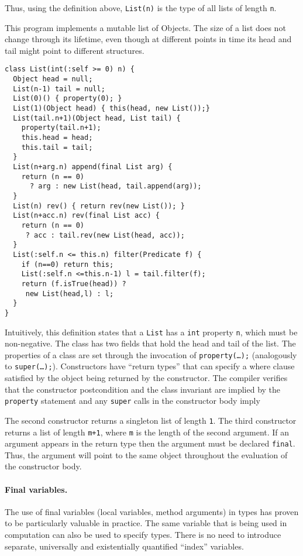 Thus, using the definition above, {\tt List(n)} is the type of
all lists of length {\tt n}.

\begin{example}[List]
This program implements a mutable list of Objects. The size of a list
does not change through its lifetime, even though at different points
in time its head and tail might point to different structures.
{\footnotesize
\begin{verbatim}
class List(int(:self >= 0) n) {
  Object head = null;
  List(n-1) tail = null;
  List(0)() { property(0); }
  List(1)(Object head) { this(head, new List());}
  List(tail.n+1)(Object head, List tail) {
    property(tail.n+1);
    this.head = head;
    this.tail = tail;
  }
  List(n+arg.n) append(final List arg) {
    return (n == 0) 
      ? arg : new List(head, tail.append(arg));
  }
  List(n) rev() { return rev(new List()); }
  List(n+acc.n) rev(final List acc) {
    return (n == 0) 
     ? acc : tail.rev(new List(head, acc));
  }
  List(:self.n <= this.n) filter(Predicate f) {
    if (n==0) return this;
    List(:self.n <=this.n-1) l = tail.filter(f);
    return (f.isTrue(head)) ?
     new List(head,l) : l;
  }
}
\end{verbatim}}
\label{fig:list-example}
Intuitively, this definition states that a {\tt List} has a {\tt int}
property {\tt n}, which must be non-negative.  The class has two
fields that hold the head and tail of the list.  The properties of a
class are set through the invocation of {\tt property(\ldots);}
(analogously to {\tt super(\ldots);}).  Constructors have ``return
types'' that can specify a where clause satisfied by the object being
returned by the constructor.  The compiler verifies that the
constructor postcondition and the class invariant are implied by the
{\tt property} statement and any {\tt super} calls in the constructor
body imply

The second constructor returns a singleton list of length {\tt 1}. The
third constructor returns a list of length {\tt m+1}, where {\tt m} is
the length of the second argument.  If an argument appears in the
return type then the argument must be declared {\tt final}.  Thus, the
argument will point to the same object throughout the evaluation of
the constructor body.
\end{example}

\paragraph{Final variables.}
The use of final variables (local variables, method arguments) in
types has proven to be particularly valuable in practice. The same
variable that is being used in computation can also be used to specify
types. There is no need to introduce separate, universally and
existentially quantified ``index'' variables.

